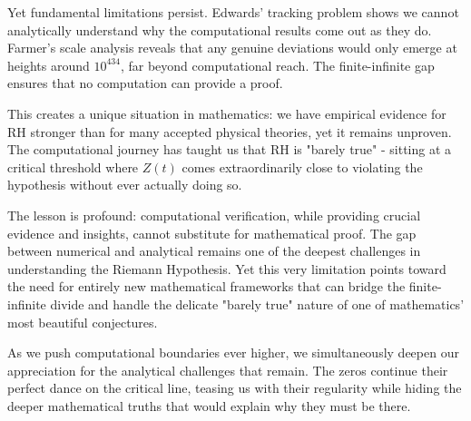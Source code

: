 Yet fundamental limitations persist. Edwards' tracking problem shows we cannot analytically understand why the computational results come out as they do. Farmer's scale analysis reveals that any genuine deviations would only emerge at heights around $10^{434}$, far beyond computational reach. The finite-infinite gap ensures that no computation can provide a proof.

This creates a unique situation in mathematics: we have empirical evidence for RH stronger than for many accepted physical theories, yet it remains unproven. The computational journey has taught us that RH is "barely true" - sitting at a critical threshold where $Z(t)$ comes extraordinarily close to violating the hypothesis without ever actually doing so.

The lesson is profound: computational verification, while providing crucial evidence and insights, cannot substitute for mathematical proof. The gap between numerical and analytical remains one of the deepest challenges in understanding the Riemann Hypothesis. Yet this very limitation points toward the need for entirely new mathematical frameworks that can bridge the finite-infinite divide and handle the delicate "barely true" nature of one of mathematics' most beautiful conjectures.

As we push computational boundaries ever higher, we simultaneously deepen our appreciation for the analytical challenges that remain. The zeros continue their perfect dance on the critical line, teasing us with their regularity while hiding the deeper mathematical truths that would explain why they must be there.